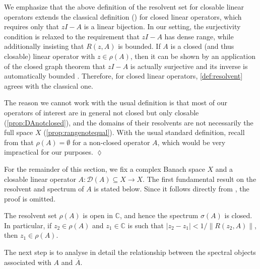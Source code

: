 \documentclass[english]{myarticle}
\begin{document}
\begin{sloppypar}
\begin{remark} \label{remark:definitionresolvent}
We emphasize that the above definition of the resolvent set for closable linear operators extends the classical definition (\cite[Definition IV.1.1]{Engel2000}) for closed linear operators, which requires only that $zI - A$ is a linear bijection. In our setting, the surjectivity condition is relaxed to the requirement that $zI - A$ has dense range, while additionally insisting that $R(z, A)$ is bounded. If $A$ is a closed (and thus closable) linear operator with $z \in \rho(A)$, then it can be shown by an application of the closed graph theorem that $zI - A$ is actually surjective and its inverse is automatically bounded \cite[Theorem 4.2.E]{Taylor1986}. Therefore, for closed linear operators, \cref{def:resolvent} agrees with the classical one.

The reason we cannot work with the usual definition is that most of our operators of interest are in general not closed but only closable (\cref{prop:DAnotclosed}), and the domains of their resolvents are not necessarily the full space $X$ (\cref{prop:rangenotequal}). With the usual standard definition, recall from \cite[Proposition XIV.1.2]{Gohberg1990} that $\rho(A) = \emptyset$ for a non-closed operator $A$, which would be very impractical for our purposes. \hfill $\lozenge$
\end{remark}

For the remainder of this section, we fix a complex Banach space $X$ and a closable linear operator $A : \mathcal{D}(A) \subseteq X \to X$. The first fundamental result on the resolvent and spectrum of $A$ is stated below. Since it follows directly from \cite[Theorems 5.1.A and 5.1.B]{Taylor1986}, the proof is omitted.

\begin{proposition} \label{prop:resolventopen}
The resolvent set $\rho(A)$ is open in $\mathbb{C}$, and hence the spectrum $\sigma(A)$ is closed. In particular, if $z_2 \in \rho(A)$ and $z_1 \in \mathbb{C}$ is such that $|z_2-z_1| < 1/ \|R(z_2,A)\|$, then $z_1 \in \rho(A)$.
\end{proposition}

The next step is to analyse in detail the relationship between the spectral objects associated with $A$ and $\overline{A}$.


\end{sloppypar}
\end{document}

